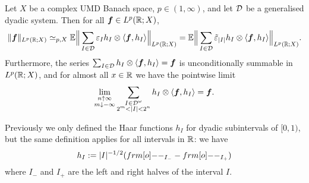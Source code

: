 \begin{thm}\label{thm:general-haar-decompositions}
  Let $X$ be a complex UMD Banach space, $p \in (1,\infty)$, and let $\mathcal{D}$ be a generalised dyadic system.
  Then for all $\bm{f} \in L^p(\mathbb{R};X)$,
  \begin{equation}\label{eq:gen-haar-sqfn}
      \|\bm{f}\|_{L^p(\mathbb{R};X)}
      \simeq_{p,X} \mathbb{E} \Big\| \sum_{I \in \mathcal{D}} \varepsilon_{I} h_{I} \otimes \langle \bm{f}, h_{I} \rangle \Big\|_{L^p(\mathbb{R};X)} 
      = \mathbb{E} \Big\| \sum_{I \in \mathcal{D}} \tilde{\varepsilon}_{|I|} h_{I} \otimes \langle \bm{f}, h_{I} \rangle \Big\|_{L^p(\mathbb{R};X)}.
  \end{equation}
  Furthermore, the series $\sum_{I \in \mathcal{D}} h_I \otimes \langle \bm{f}, h_{I} \rangle = \bm{f}$ is unconditionally summable in $L^p(\mathbb{R};X)$, and for almost all $x \in \mathbb{R}$ we have the pointwise limit
  \begin{equation*}
    \lim_{\substack{n \uparrow \infty \\ m \downarrow -\infty}} \sum_{\substack{I \in \mathcal{D}^{\omega} \\ 2^{m} < |I| < 2^{n}}} h_{I} \otimes \langle \bm{f}, h_{I} \rangle = \bm{f}.
  \end{equation*}
\end{thm}

\begin{rmk}
  Previously we only defined the Haar functions $h_{I}$ for dyadic subintervals of $[0,1)$, but the same definition applies for all intervals in $\mathbb{R}$:
  we have
  \begin{equation*}
    h_{I} := |I|^{-1/2}(\1_{I_{-}} - \1_{I_{+}})
  \end{equation*}
  where $I_{-}$ and $I_{+}$ are the left and right halves of the interval $I$.
\end{rmk}

